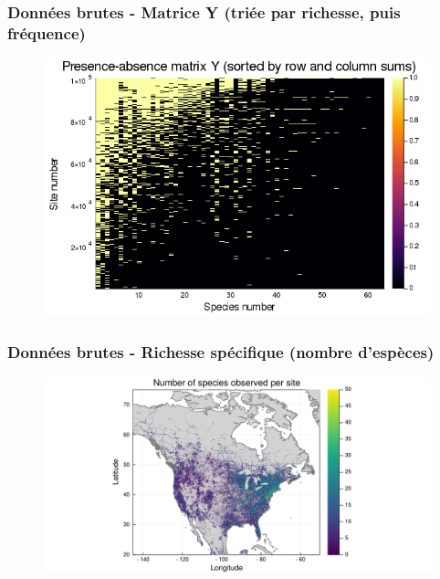 \documentclass[10pt]{beamer}
\begin{document}
\begin{frame}
  \frametitle{Données brutes - Matrice Y (triée par richesse, puis fréquence)}
  \begin{figure}
    \centering
    \includegraphics[scale=0.4]{fig/raw-Y-rowcolsorted.png}
  \end{figure}
\end{frame}

\begin{frame}
  \frametitle{Données brutes - Richesse spécifique (nombre d'espèces)}
  \begin{figure}
    \centering
    \hspace*{-2cm}\includegraphics[scale=0.5]{fig/raw-richness.pdf}
  \end{figure}
\end{frame}
\end{document}
